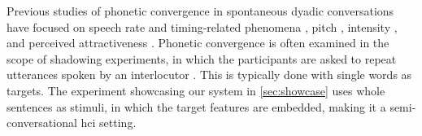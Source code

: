 Previous studies of phonetic convergence in spontaneous dyadic conversations have focused on speech rate \citep{Schweitzer2016exemplar} and timing-related phenomena \citep{Putman1984conception}, pitch \citep{Gessinger2018pitch, Schweitzer2017visibility}, intensity \citep{Levitan2011measuring, Natale1975convergence}, and perceived attractiveness \citep{Michalsky2017pitch}.
Phonetic convergence is often examined in the scope of shadowing experiments, in which the participants are asked to repeat utterances spoken by an interlocutor \citep{Pardo2017phonetic, Dias2016visibilivty, Walker2015repeat}.
This is typically done with single words as targets.
The experiment showcasing our system in \cref{sec:showcase} uses whole sentences as stimuli, in which the target features are embedded, making it a semi-conversational \ac{hci} setting.

% 